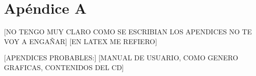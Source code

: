 \chapter*{Apéndice A}
[NO TENGO MUY CLARO COMO SE ESCRIBIAN LOS APENDICES NO TE VOY A ENGAÑAR]
[EN LATEX ME REFIERO]

[APENDICES PROBABLES:]
[MANUAL DE USUARIO, COMO GENERO GRAFICAS, CONTENIDOS DEL CD]









 